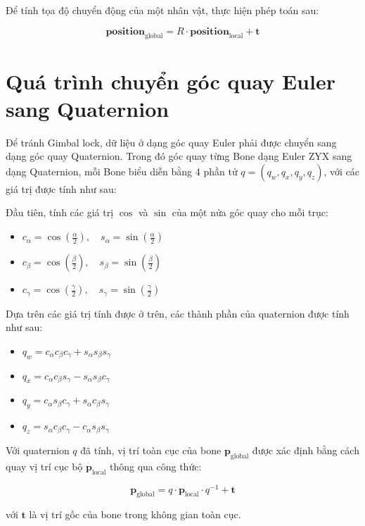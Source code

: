 Để tính tọa độ chuyển động của một nhân vật, thực hiện phép toán sau:

\begin{equation}
	\mathbf{position}_{\text{global}} = R \cdot \mathbf{position}_{\text{local}} + \mathbf{t}
\end{equation}


\section{Quá trình chuyển góc quay Euler sang Quaternion}
\label{appendix:BVHData:QuaternionConvert}


Để tránh Gimbal lock, dữ liệu ở dạng góc quay Euler phải được chuyển sang dạng góc quay Quaternion. Trong đó góc quay từng Bone dạng Euler ZYX sang dạng Quaternion, mỗi Bone biểu diễn bằng 4 phần tử $q = (q_w, q_x, q_y, q_z)$, với các giá trị được tính như sau:

Đầu tiên, tính các giá trị $\cos$ và $\sin$ của một nửa góc quay cho mỗi trục:


\begin{itemize}
	\item $c_{\alpha} = \cos\left(\frac{\alpha}{2}\right), \quad s_{\alpha} = \sin\left(\frac{\alpha}{2}\right)$
	\item $c_{\beta} = \cos\left(\frac{\beta}{2}\right), \quad s_{\beta} = \sin\left(\frac{\beta}{2}\right)$
	\item $c_{\gamma} = \cos\left(\frac{\gamma}{2}\right), \quad s_{\gamma} = \sin\left(\frac{\gamma}{2}\right)$
\end{itemize}

Dựa trên các giá trị tính được ở trên, các thành phần của quaternion được tính như sau:


\begin{itemize}
	\item $q_w = c_{\alpha} c_{\beta} c_{\gamma} + s_{\alpha} s_{\beta} s_{\gamma}$
	\item $q_x = c_{\alpha} c_{\beta} s_{\gamma} - s_{\alpha} s_{\beta} c_{\gamma}$
	\item $q_y = c_{\alpha} s_{\beta} c_{\gamma} + s_{\alpha} c_{\beta} s_{\gamma}$
	\item $q_z = s_{\alpha} c_{\beta} c_{\gamma} - c_{\alpha} s_{\beta} s_{\gamma}$
\end{itemize}

Với quaternion $q$ đã tính, vị trí toàn cục của bone $\mathbf{p}_{\text{global}}$ được xác định bằng cách quay vị trí cục bộ $\mathbf{p}_{\text{local}}$ thông qua công thức:

\begin{equation}
	\mathbf{p}_{\text{global}} = q \cdot \mathbf{p}_{\text{local}} \cdot q^{-1} + \mathbf{t}
\end{equation}

với $\mathbf{t}$ là vị trí gốc của bone trong không gian toàn cục.
